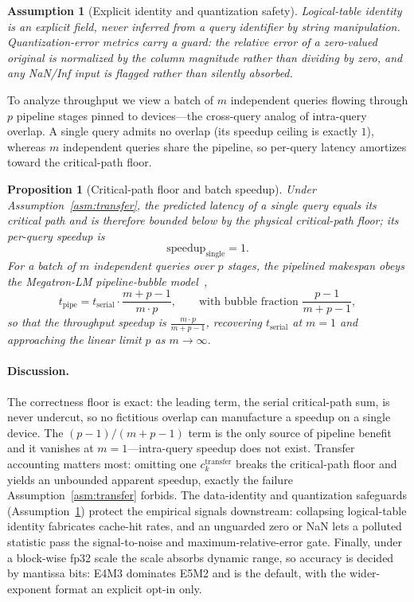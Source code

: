 \documentclass{article}
\newtheorem{proposition}{Proposition}
\newtheorem{assumption}{Assumption}
\begin{document}
\begin{assumption}[Explicit identity and quantization safety]
\label{asm:safety}
Logical-table identity is an explicit field, never inferred from a query
identifier by string manipulation. Quantization-error metrics carry a guard: the
relative error of a zero-valued original is normalized by the column magnitude
rather than dividing by zero, and any NaN/Inf input is flagged rather than
silently absorbed.
\end{assumption}

To analyze throughput we view a batch of $m$ independent queries flowing through
$p$ pipeline stages pinned to devices---the cross-query analog of intra-query
overlap. A single query admits no overlap (its speedup ceiling is exactly $1$),
whereas $m$ independent queries share the pipeline, so per-query latency
amortizes toward the critical-path floor.

\begin{proposition}[Critical-path floor and batch speedup]
\label{prop:costmodel}
Under Assumption~\ref{asm:transfer}, the predicted latency of a single query
equals its critical path and is therefore bounded below by the physical
critical-path floor; its per-query speedup is
\begin{equation}
\mathrm{speedup}_{\mathrm{single}} = 1.
\end{equation}
For a batch of $m$ independent queries over $p$ stages, the pipelined makespan
obeys the Megatron-LM pipeline-bubble model~\citep{narayanan2021efficient},
\begin{equation}
\label{eq:bubble}
t_{\mathrm{pipe}} = t_{\mathrm{serial}} \cdot \frac{m + p - 1}{m \cdot p},
\qquad \text{with bubble fraction } \frac{p-1}{m+p-1},
\end{equation}
so that the throughput speedup is $\frac{m \cdot p}{m + p - 1}$, recovering
$t_{\mathrm{serial}}$ at $m=1$ and approaching the linear limit $p$ as
$m \to \infty$.
\end{proposition}

\paragraph{Discussion.} The correctness floor is exact: the leading term, the
serial critical-path sum, is never undercut, so no fictitious overlap can
manufacture a speedup on a single device. The $(p-1)/(m+p-1)$ term is the only
source of pipeline benefit and it vanishes at $m=1$---intra-query speedup does
not exist. Transfer accounting matters most: omitting one
$c^{\mathrm{transfer}}_k$ breaks the critical-path floor and yields an unbounded
apparent speedup, exactly the failure Assumption~\ref{asm:transfer} forbids. The
data-identity and quantization safeguards (Assumption~\ref{asm:safety}) protect
the empirical signals downstream: collapsing logical-table identity fabricates
cache-hit rates, and an unguarded zero or NaN lets a polluted statistic pass the
signal-to-noise and maximum-relative-error gate. Finally, under a block-wise
fp32 scale the scale absorbs dynamic range, so accuracy is decided by mantissa
bits: E4M3 dominates E5M2 and is the default, with the wider-exponent format an
explicit opt-in only.
\end{document}

